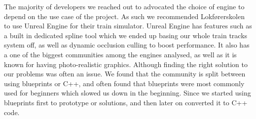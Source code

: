 The majority of developers we reached out to advocated the choice of engine to depend on the use case of the project. As such we recommended Lokførerskolen to use Unreal Engine for their train simulator. Unreal Engine has features such as a built in dedicated spline tool which we ended up basing our whole train tracks system off, as well as dynamic occlusion culling to boost performance. It also has a one of the biggest communities among the engines analysed, as well as it is known for having photo-realistic graphics. Although finding the right solution to our problems was often an issue. We found that the community is split between using blueprints or C++, and often found that blueprints were most commonly used for beginners which slowed us down in the beginning. Since we started using blueprints first to prototype or solutions, and then later on converted it to C++ code.

